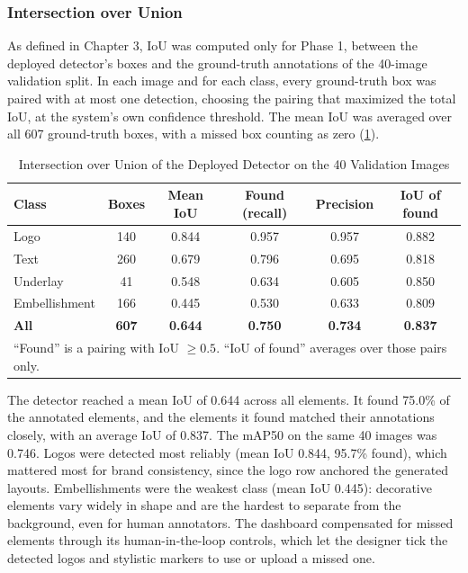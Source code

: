 \begin{refsection}
\subsubsection{Intersection over Union}

As defined in Chapter 3, IoU was computed only for Phase 1, between the deployed detector's boxes and the ground-truth annotations of the 40-image validation split. In each image and for each class, every ground-truth box was paired with at most one detection, choosing the pairing that maximized the total IoU, at the system's own confidence threshold. The mean IoU was averaged over all 607 ground-truth boxes, with a missed box counting as zero (\ref{tab:iou}).

\begin{table}[ht]
\centering
\caption{Intersection over Union of the Deployed Detector on the 40 Validation Images}
\label{tab:iou}
\small
\begin{tabular}{l c c c c c}
\hline
\textbf{Class} & \textbf{Boxes} & \textbf{Mean IoU} & \textbf{Found (recall)} & \textbf{Precision} & \textbf{IoU of found} \\ \hline
Logo & 140 & 0.844 & 0.957 & 0.957 & 0.882 \\
Text & 260 & 0.679 & 0.796 & 0.695 & 0.818 \\
Underlay & 41 & 0.548 & 0.634 & 0.605 & 0.850 \\
Embellishment & 166 & 0.445 & 0.530 & 0.633 & 0.809 \\ \hline
\textbf{All} & \textbf{607} & \textbf{0.644} & \textbf{0.750} & \textbf{0.734} & \textbf{0.837} \\ \hline
\multicolumn{6}{p{0.86\textwidth}}{\footnotesize ``Found'' is a pairing with IoU $\geq 0.5$. ``IoU of found'' averages over those pairs only.}
\end{tabular}
\end{table}

The detector reached a mean IoU of 0.644 across all elements. It found 75.0\% of the annotated elements, and the elements it found matched their annotations closely, with an average IoU of 0.837. The mAP50 on the same 40 images was 0.746. Logos were detected most reliably (mean IoU 0.844, 95.7\% found), which mattered most for brand consistency, since the logo row anchored the generated layouts. Embellishments were the weakest class (mean IoU 0.445): decorative elements vary widely in shape and are the hardest to separate from the background, even for human annotators. The dashboard compensated for missed elements through its human-in-the-loop controls, which let the designer tick the detected logos and stylistic markers to use or upload a missed one.


\end{refsection}
